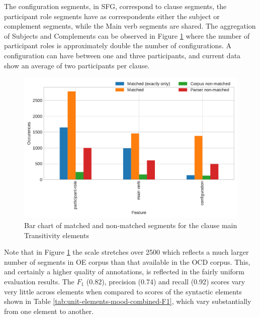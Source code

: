     The configuration segments, in SFG, correspond to clause segments, the participant role segments have as correspondents either the subject or complement segments, while the Main verb segments are shared. The aggregation of Subjects and Complements can be observed in Figure \ref{fig:unit-elements-transitivity-data} where the number of participant roles is approximately double the number of configurations. A configuration can have between one and three participants, and current data show an average of two participants per clause. 
    
    \begin{figure}[!ht]
    \centering
    \includegraphics[width=.85\textwidth]{evaluation-results/figures/unit-elements-transitivity-data.pdf}
    \caption{Bar chart of matched and non-matched segments for the clause main Transitivity elements}
    \label{fig:unit-elements-transitivity-data}
    \end{figure}
    
    Note that in Figure \ref{fig:unit-elements-transitivity-data} the scale stretches over 2500 which reflects a much larger number of segments in OE corpus than that available in the OCD corpus. This, and certainly a higher quality of annotations, is reflected in the fairly uniform evaluation results. The $F_1$ (0.82), precision (0.74) and recall (0.92) scores vary very little across elements when compared to scores of the syntactic elements shown in Table \ref{tab:unit-elements-mood-combined-F1},  which vary substantially from one element to another.   


